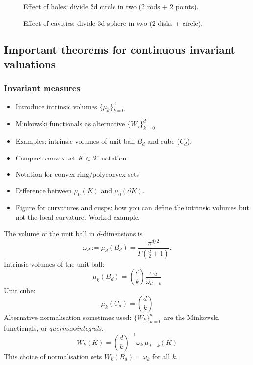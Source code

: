 \begin{SCfigure}[H]
  \caption{Effect of holes: divide 2d circle in two (2 rods + 2 points).}
\end{SCfigure}

\begin{SCfigure}[H]
  \caption{Effect of cavities: divide 3d sphere in two (2 disks + circle).}
\end{SCfigure}

\subsection{Important theorems for continuous invariant valuations}

\subsubsection{Invariant measures}

\begin{itemize}
\item Introduce intrinsic volumes $\{\mu_k\}_{k=0}^d$
\item Minkowski functionals as alternative $\{W_k\}_{k=0}^d$
\item Examples: intrinsic volumes of unit ball $B_d$ and cube ($C_d$).
\item Compact convex set $K \in \mathcal{K}$ notation.
\item Notation for convex ring/polyconvex sets
\item Difference between $\mu_0(K)$ and $\mu_0(\partial K)$.
\item Figure for curvatures and cusps: how you can define the intrinsic volumes but not the local curvature. Worked example.
\end{itemize}

The volume of the unit ball in $d$-dimensions is
\begin{equation}
  \omega_d := \mu_d(B_d) = \frac{\pi^{d/2}}{\Gamma(\frac{d}{2} + 1)}.
\end{equation}
Intrinsic volumes of the unit ball:
\begin{equation}\label{eq:intrinsic-volume-ball}
  \mu_k (B_d) = {d \choose k} \frac{\omega_d}{\omega_{d-k}}
\end{equation}
Unit cube:
\begin{equation}
  \mu_k (C_d) = {d \choose k}
\end{equation}
Alternative normalisation sometimes used: $\{W_k\}_{k=0}^d$ are the Minkowski functionals, or \emph{quermassintegrals}.
\begin{equation}
  W_k(K) = {d \choose k}^{-1} \omega_k \, \mu_{d-k}(K)
\end{equation}
This choice of normalisation sets $W_k(B_d) = \omega_k$ for all $k$.

